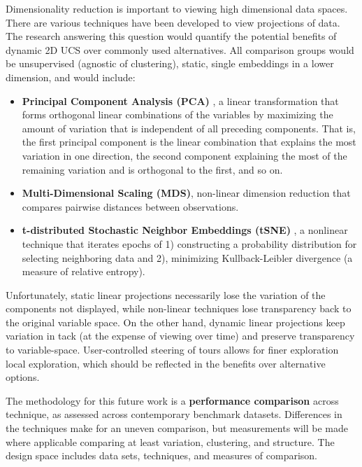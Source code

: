 \documentclass{monashthesis}
\begin{document}
Dimensionality reduction is important to viewing high dimensional data spaces. There are various techniques have been developed to view projections of data. The research answering this question would quantify the potential benefits of dynamic 2D UCS over commonly used alternatives. All comparison groups would be unsupervised (agnostic of clustering), static, single embeddings in a lower dimension, and would include:

\begin{itemize}
\tightlist
\item
  \textbf{Principal Component Analysis (PCA)} \autocite{pearson_liii._1901}, a linear transformation that forms orthogonal linear combinations of the variables by maximizing the amount of variation that is independent of all preceding components. That is, the first principal component is the linear combination that explains the most variation in one direction, the second component explaining the most of the remaining variation and is orthogonal to the first, and so on.
\item
  \textbf{Multi-Dimensional Scaling (MDS)}, non-linear dimension reduction that compares pairwise distances between observations.
\item
  \textbf{t-distributed Stochastic Neighbor Embeddings (tSNE)} \autocite{maaten_visualizing_2008}, a nonlinear technique that iterates epochs of 1) constructing a probability distribution for selecting neighboring data and 2), minimizing Kullback-Leibler divergence (a measure of relative entropy).
\end{itemize}

Unfortunately, static linear projections necessarily lose the variation of the components not displayed, while non-linear techniques lose transparency back to the original variable space. On the other hand, dynamic linear projections keep variation in tack (at the expense of viewing over time) and preserve transparency to variable-space. User-controlled steering of tours allows for finer exploration local exploration, which should be reflected in the benefits over alternative options.

The methodology for this future work is a \textbf{performance comparison} across technique, as assessed across contemporary benchmark datasets. Differences in the techniques make for an uneven comparison, but measurements will be made where applicable comparing at least variation, clustering, and structure. The design space includes data sets, techniques, and measures of comparison.
\end{document}

